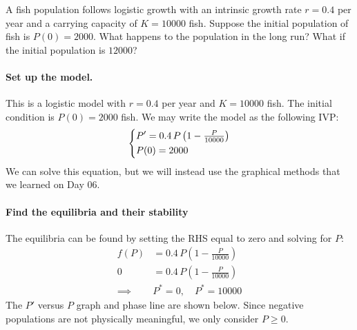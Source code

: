 \documentclass[10pt,letterpaper]{article}
\begin{document}
\begin{example}[2]{    
A fish population follows logistic growth with an intrinsic growth rate $r=0.4$ per year and a carrying capacity of $K=10000$ fish.
Suppose the initial population of fish is $P(0)=2000$. What happens to the population in the long run? What if the initial population is $12000$?
}

\paragraph{Set up the model.} This is a logistic model with $r=0.4$ per year and $K=10000$ fish. The initial condition is $P(0)=2000$ fish. We may write the model as the following IVP: 
$$
\begin{dcases}
    P' = 0.4\,P\left(1-\tfrac{P}{10000}\right)\\
    P(0)=2000
\end{dcases}
$$
We can solve this equation, but we will instead use the graphical methods that we learned on Day 06.

\paragraph{Find the equilibria and their stability}
The equilibria can be found by setting the RHS equal to zero and solving for $P$:
\begin{align*}
     f(P)&=0.4\,P\left(1-\tfrac{P}{10000}\right)\\
        0&=0.4\,P\left(1-\tfrac{P}{10000}\right)\\
     \implies&P^*=0, \quad P^*= 10000
\end{align*}
The $P'$ versus $P$ graph and phase line are shown below. Since negative
populations are not physically meaningful, we only consider $P\geq0$.
\begin{figure}[H]
    \centering
{}
\end{figure}


\end{example}
\end{document}
